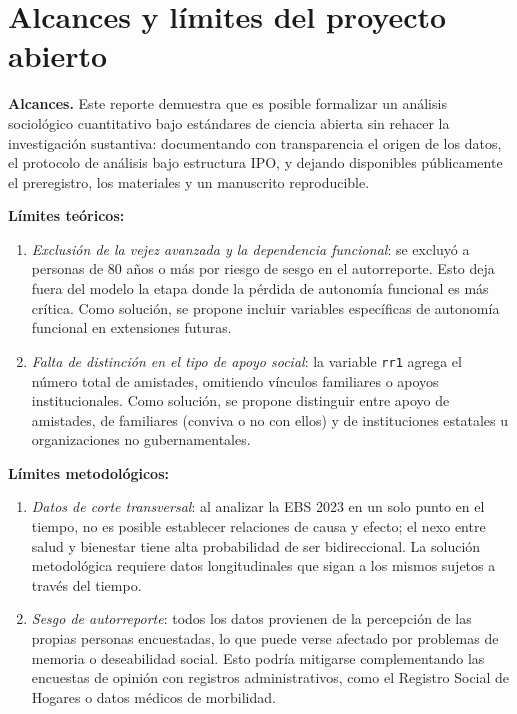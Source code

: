 \documentclass[
  spanish,
  a4paper,
  oneside]{scrbook}
\providecommand{\tightlist}{%
  \setlength{\itemsep}{0pt}\setlength{\parskip}{0pt}}
\begin{document}
\section{Alcances y límites del proyecto
abierto}\label{alcances-y-luxedmites-del-proyecto-abierto}

\textbf{Alcances.} Este reporte demuestra que es posible formalizar un
análisis sociológico cuantitativo bajo estándares de ciencia abierta sin
rehacer la investigación sustantiva: documentando con transparencia el
origen de los datos, el protocolo de análisis bajo estructura IPO, y
dejando disponibles públicamente el preregistro, los materiales y un
manuscrito reproducible.

\textbf{Límites teóricos:}

\begin{enumerate}
\def\labelenumi{\arabic{enumi}.}
\tightlist
\item
  \emph{Exclusión de la vejez avanzada y la dependencia funcional}: se
  excluyó a personas de 80 años o más por riesgo de sesgo en el
  autorreporte. Esto deja fuera del modelo la etapa donde la pérdida de
  autonomía funcional es más crítica. Como solución, se propone incluir
  variables específicas de autonomía funcional en extensiones futuras.
\item
  \emph{Falta de distinción en el tipo de apoyo social}: la variable
  \texttt{rr1} agrega el número total de amistades, omitiendo vínculos
  familiares o apoyos institucionales. Como solución, se propone
  distinguir entre apoyo de amistades, de familiares (conviva o no con
  ellos) y de instituciones estatales u organizaciones no
  gubernamentales.
\end{enumerate}

\textbf{Límites metodológicos:}

\begin{enumerate}
\def\labelenumi{\arabic{enumi}.}
\tightlist
\item
  \emph{Datos de corte transversal}: al analizar la EBS 2023 en un solo
  punto en el tiempo, no es posible establecer relaciones de causa y
  efecto; el nexo entre salud y bienestar tiene alta probabilidad de ser
  bidireccional. La solución metodológica requiere datos longitudinales
  que sigan a los mismos sujetos a través del tiempo.
\item
  \emph{Sesgo de autorreporte}: todos los datos provienen de la
  percepción de las propias personas encuestadas, lo que puede verse
  afectado por problemas de memoria o deseabilidad social. Esto podría
  mitigarse complementando las encuestas de opinión con registros
  administrativos, como el Registro Social de Hogares o datos médicos de
  morbilidad.
\end{enumerate}
\end{document}
